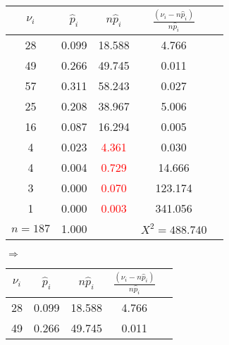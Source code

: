 \documentclass[a4paper,12pt]{article}
\begin{document}
\begin{enumerate}
              \begin{tabular}{|c|c|c|c|c|}
                  \hline
                  $\nu_i$   & $\widehat{p}_i$ & $n \widehat{p}_i$      & $\frac{(\nu_i - n \widehat{p}_i)}{n \widehat{p}_i}$ \\
                  \hline
                  28        & 0.099           & 18.588                 & 4.766                                               \\
                  49        & 0.266           & 49.745                 & 0.011                                               \\
                  57        & 0.311           & 58.243                 & 0.027                                               \\
                  25        & 0.208           & 38.967                 & 5.006                                               \\
                  16        & 0.087           & 16.294                 & 0.005                                               \\
                  4         & 0.023           & \textcolor{red}{4.361} & 0.030                                               \\
                  4         & 0.004           & \textcolor{red}{0.729} & 14.666                                              \\
                  3         & 0.000           & \textcolor{red}{0.070} & 123.174                                             \\
                  1         & 0.000           & \textcolor{red}{0.003} & 341.056                                             \\
                  \hline
                  $n = 187$ & 1.000           &                        & $X^2 = 488.740$                                     \\
                  \hline
              \end{tabular}
              $\Rightarrow$
              \begin{tabular}{|c|c|c|c|c|}
                  \hline
                  $\nu_i$   & $\widehat{p}_i$ & $n \widehat{p}_i$ & $\frac{(\nu_i - n \widehat{p}_i)}{n \widehat{p}_i}$ \\
                  \hline
                  28        & 0.099           & 18.588            & 4.766                                               \\
                  49        & 0.266           & 49.745            & 0.011                                               \\

\end{tabular}
\end{enumerate}
\end{document}
